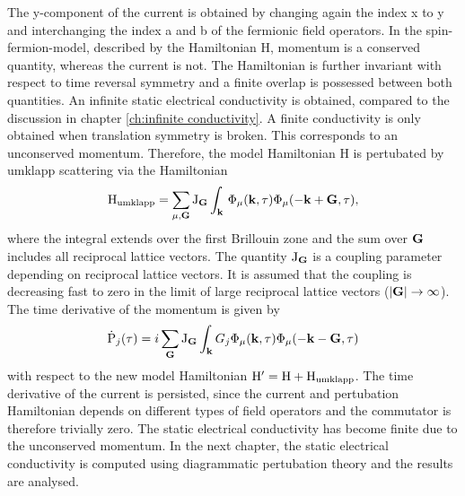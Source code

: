%
The y-component of the current is obtained by changing again the index x to y and interchanging the index a and b of the fermionic field operators.
In the spin-fermion-model, described by the Hamiltonian H, momentum is a conserved quantity, whereas the current is not.
The Hamiltonian is further invariant with respect to time reversal symmetry and a finite overlap is possessed between both quantities.
An infinite static electrical conductivity is obtained, compared to the discussion in chapter \ref{ch:infinite conductivity}.
A finite conductivity is only obtained when translation symmetry is broken.
This corresponds to an unconserved momentum.
Therefore, the model Hamiltonian H is pertubated by umklapp scattering via the Hamiltonian
%
\begin{align}
	\mathrm{H}_{\mathrm{umklapp}} = \sum\limits_{\mu, \vb{G}} \mathrm{J}_{\vb{G}}
		\int_{\vb{k}}\, \Phi_{\mu}(\vb{k},\tau) \Phi_{\mu}(-\vb{k}+\vb{G},\tau),
	\label{eq:Hamiltonian umklapp scattering}
\end{align}
%
where the integral extends over the first Brillouin zone and the sum over $\vb{G}$ includes all reciprocal lattice vectors.
The quantity $\mathrm{J}_{\vb{G}}$ is a coupling parameter depending on reciprocal lattice vectors.
It is assumed that the coupling is decreasing fast to zero in the limit of large reciprocal lattice vectors ($|\vb{G}| \to \infty$).
The time derivative of the momentum is given by
%
\begin{align}
	\dot{\mathrm{P}}_{j}(\tau) = i \sum\limits_{\vb{G}} \mathrm{J}_{\vb{G}} \int_{\vb{k}} G_{j} \Phi_{\mu}(\vb{k},\tau) \Phi_{\mu}(-\vb{k} - \vb{G},\tau)
	\label{eq:time derivative momentum finite}
\end{align}
%
with respect to the new model Hamiltonian $\mathrm{H}' = \mathrm{H} + \mathrm{H}_{\mathrm{umklapp}}$.
The time derivative of the current is persisted, since the current and pertubation Hamiltonian depends on different types of field operators and the commutator is therefore trivially zero.
The static electrical conductivity has become finite due to the unconserved momentum.
In the next chapter, the static electrical conductivity is computed using diagrammatic pertubation theory and the results are analysed.














